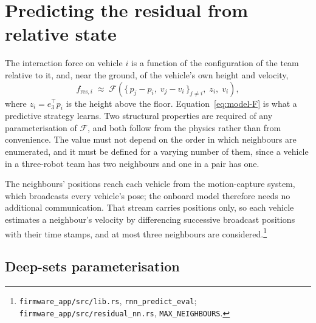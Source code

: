 \section{Predicting the residual from relative state}
\label{sec:model-deepsets}

The interaction force on vehicle $i$ is a function of the configuration of the team relative to it,
and, near the ground, of the vehicle's own height and velocity,
%
\begin{equation}
  f_{\mathrm{res},i} \;\approx\; \mathcal{F}\!\left( \{\, p_j - p_i,\; v_j - v_i \,\}_{j \neq i},\; z_i,\; v_i \right),
  \label{eq:model-F}
\end{equation}
%
where $z_i = e_3^\top p_i$ is the height above the floor. Equation~\eqref{eq:model-F} is what a
predictive strategy learns. Two structural properties are required
of any parameterisation of $\mathcal{F}$, and both follow from the physics rather than from
convenience. The value must not depend on the order in which neighbours are enumerated, and it must
be defined for a varying number of them, since a vehicle in a three-robot team has two neighbours
and one in a pair has one.

The neighbours' positions reach each vehicle from the motion-capture system, which broadcasts every
vehicle's pose; the onboard model therefore needs no additional communication. That stream carries
positions only, so each vehicle estimates a neighbour's velocity by differencing successive
broadcast positions with their time stamps, and at most three neighbours are
considered.\footnote{\texttt{firmware\_app/src/lib.rs}, \texttt{rnn\_predict\_eval};
\texttt{firmware\_app/src/residual\_nn.rs}, \texttt{MAX\_NEIGHBOURS}.}

\subsection{Deep-sets parameterisation}

